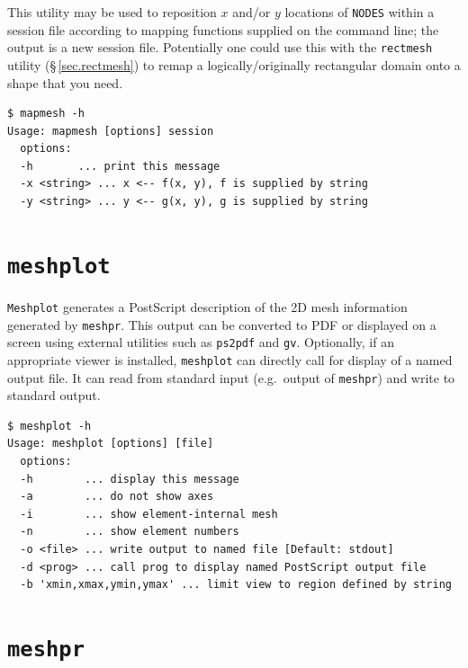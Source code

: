 \documentclass[11pt]{report}
\newcommand{\eg}{e.g.\ } \newcommand{\CC}{\mathrm{c.c.}}
\begin{document}
This utility may be used to reposition $x$ and/or $y$ locations of
\verb|NODES| within a session file according to mapping functions
supplied on the command line; the output is a new session file.
Potentially one could use this with the \verb|rectmesh| utility
(\S\,\ref{sec.rectmesh}) to remap a logically/originally rectangular
domain onto a shape that you need.
%
{\small
\begin{verbatim}
$ mapmesh -h
Usage: mapmesh [options] session
  options:
  -h       ... print this message
  -x <string> ... x <-- f(x, y), f is supplied by string
  -y <string> ... y <-- g(x, y), g is supplied by string
\end{verbatim}
}
%

\section{\texttt{meshplot}}
\label{sec.meshpr}

\verb|Meshplot| generates a PostScript description of the 2D mesh
information generated by \verb|meshpr|.  This output can be converted
to PDF or displayed on a screen using external utilities such as
\verb|ps2pdf| and \verb|gv|.  Optionally, if an appropriate viewer is
installed, \verb|meshplot| can directly call for display of a named
output file.  It can read from standard input (\eg output of
\verb|meshpr|) and write to standard output.
%
{\small
\begin{verbatim}
$ meshplot -h
Usage: meshplot [options] [file]
  options:
  -h        ... display this message
  -a        ... do not show axes
  -i        ... show element-internal mesh
  -n        ... show element numbers
  -o <file> ... write output to named file [Default: stdout]
  -d <prog> ... call prog to display named PostScript output file
  -b 'xmin,xmax,ymin,ymax' ... limit view to region defined by string
\end{verbatim}
}

\section{\texttt{meshpr}}
\label{sec.meshpr}
\end{document}
